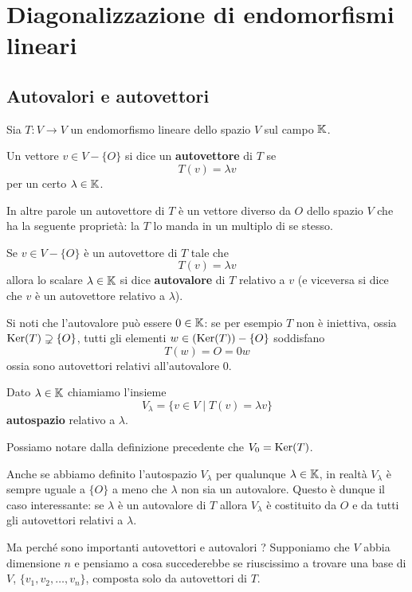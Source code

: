 \chapter{Diagonalizzazione di endomorfismi lineari}
\section{Autovalori e autovettori}
Sia $T : V \to V$ un endomorfismo lineare dello spazio $V$ sul campo $\mathbb{K}$.

\begin{definition}
	Un vettore $v \in V - \{O\}$ si dice un \textbf{autovettore} di $T$ se
	\[
		T(v) = \lambda v
	\]
	per un certo $\lambda \in \mathbb{K}$.
\end{definition}

In altre parole un autovettore di $T$ è un vettore diverso da $O$ dello spazio $V$
che ha la seguente proprietà: la $T$ lo manda in un multiplo di se stesso.

\begin{definition}
	Se $v \in V - \{O\}$ è un autovettore di $T$ tale che
	\[
		T(v) = \lambda v
	\]
	allora lo scalare $\lambda \in \mathbb{K}$ si dice \textbf{autovalore} di $T$
	relativo a $v$ (e viceversa si dice che $v$ è un autovettore relativo a
	$\lambda$).
\end{definition}

Si noti che l'autovalore può essere $0 \in \mathbb{K}$: se per esempio $T$ non
è iniettiva, ossia $\operatorname{Ker}(T) \supsetneq \{O\}$, tutti gli elementi
$w \in (\operatorname{Ker}(T)) - \{O\}$ soddisfano
\[
	T(w) = O = 0w
\]
ossia sono autovettori relativi all'autovalore 0.

\begin{definition}
	Dato $\lambda \in \mathbb{K}$ chiamiamo l'insieme
	\[
		V_\lambda = \{v \in V \mid T(v) = \lambda v\}
	\]
	\textbf{autospazio} relativo a $\lambda$.
\end{definition}

\begin{observation}
	Possiamo notare dalla definizione precedente che $V_0 = \operatorname{Ker}(T)$.
\end{observation}

Anche se abbiamo definito l'autospazio $V_\lambda$ per qualunque
$\lambda \in \mathbb{K}$, in realtà $V_\lambda$ è sempre uguale a $\{O\}$ a
meno che $\lambda$ non sia un autovalore. Questo è dunque il caso interessante:
se $\lambda$ è un autovalore di $T$ allora $V_\lambda$ è costituito da $O$ e
da tutti gli autovettori relativi a $\lambda$.

Ma perché sono importanti autovettori e autovalori ?
Supponiamo che $V$ abbia dimensione $n$ e pensiamo a cosa succederebbe se
riuscissimo a trovare una base di $V$, $\{v_1, v_2, \dots, v_n\}$, composta solo
da autovettori di $T$.


